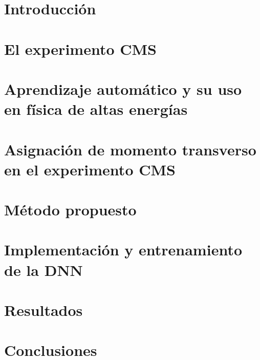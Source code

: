 \documentclass[a4paper,12pt]{article}
\begin{document}
\newpage

\section{Introducci\'on}\label{sec:intro}



\newpage

\section{El experimento CMS}\label{sec:CMS}



\newpage

\section{Aprendizaje autom\'atico y su uso en f\'isica de altas energ\'ias}\label{sec:ML}



\newpage

\section{Asignaci\'on de momento transverso en el experimento CMS}\label{sec:current_assignment}



\newpage

\section{M\'etodo propuesto}\label{sec:methodology}



\newpage

\section{Implementaci\'on y entrenamiento de la DNN}\label{sec:training}



\newpage

\section{Resultados}\label{sec:results}



\newpage

\section{Conclusiones}\label{sec:conclusions}



\newpage



\end{document}
